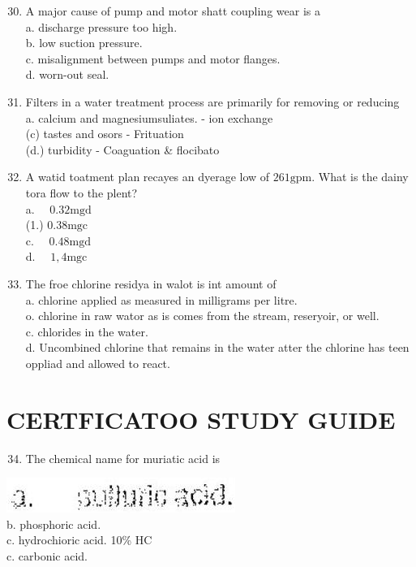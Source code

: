 \documentclass[10pt]{article}
\begin{document}
\begin{enumerate}
  \setcounter{enumi}{29}
  \item A major cause of pump and motor shatt coupling wear is a\\
a. discharge pressure too high.\\
b. low suction pressure.\\
c. misalignment between pumps and motor flanges.\\
d. worn-out seal.

  \item Filters in a water treatment process are primarily for removing or reducing\\
a. calcium and magnesiumsuliates. - ion exchange\\
(c) tastes and osors - Frituation\\
(d.) turbidity - Coaguation \& flocibato

  \item A watid toatment plan recayes an dyerage low of $261 \mathrm{gpm}$. What is the dainy tora flow to the plent?\\
a. $\quad 0.32 \mathrm{mgd}$\\
(1.) $0.38 \mathrm{mgc}$\\
c. $\quad 0.48 \mathrm{mgd}$\\
d. $\quad 1,4 \mathrm{mgc}$

  \item The froe chlorine residya in walot is int amount of\\
a. chlorine applied as measured in milligrams per litre.\\
o. chlorine in raw wator as is comes from the stream, reseryoir, or well.\\
c. chlorides in the water.\\
d. Uncombined chlorine that remains in the water atter the chlorine has teen oppliad and allowed to react.

\end{enumerate}

\section{CERTFICATOO STUDY GUIDE}
\begin{enumerate}
  \setcounter{enumi}{33}
  \item The chemical name for muriatic acid is
\end{enumerate}

\includegraphics[max width=\textwidth]{2022_11_11_ca6a6c1a0324ee23e523g-22}\\
b. phosphoric acid.\\
c. hydrochioric acid. 10\% HC\\
c. carbonic acid.
\end{document}
